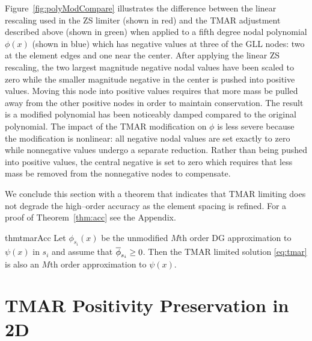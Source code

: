 \documentclass{ametsoc}
\begin{document}
Figure~\ref{fig:polyModCompare} illustrates the difference between the linear rescaling used in the ZS limiter (shown in red) and the TMAR adjustment described above (shown in green) when applied to a fifth degree nodal polynomial $\phi(x)$ (shown in blue) which has negative values at three of the GLL nodes: two at the element edges and one near the center. After applying the linear ZS rescaling, the two largest magnitude negative nodal values have been scaled to zero while the smaller magnitude negative in the center is pushed into positive values. Moving this node into positive values requires that more mass be pulled away from the other positive nodes in order to maintain conservation. The result is a modified polynomial has been noticeably damped compared to the original polynomial. The impact of the TMAR modification on $\phi$ is less severe because the modification is nonlinear: all negative nodal values are set exactly to zero while nonnegative values undergo a separate reduction. Rather than being pushed into positive values, the central negative is set to zero which requires that less mass be removed from the nonnegative nodes to compensate.

We conclude this section with a theorem that indicates that TMAR limiting does not degrade the high--order accuracy as the element spacing is refined. For a proof of Theorem~\ref{thm:acc} see the Appendix.
\begin{restatable}{thm}{tmarAcc}
\label{thm:acc}
Let $\phi_{s_i}(x)$ be the unmodified $M$th order DG approximation to $\psi(x)$ in $s_i$ and assume that $\overline{\phi}_{s_i} \geq 0$. Then the TMAR limited solution \eqref{eq:tmar} is also an $M$th order approximation to $\psi(x)$.
\end{restatable}
\section{TMAR Positivity Preservation in 2D} \label{sec:pp2d}
\end{document}
